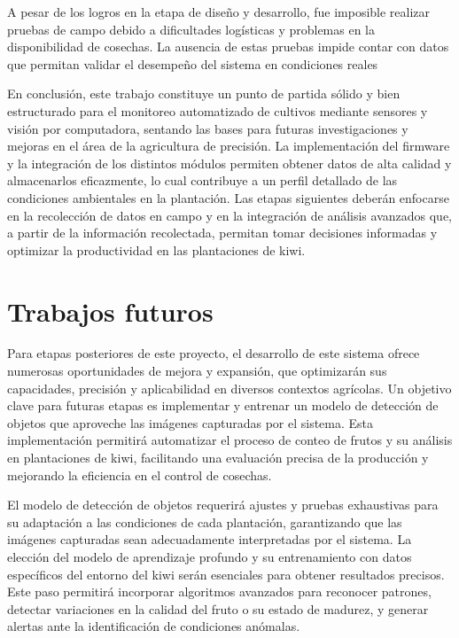A pesar de los logros en la etapa de diseño y desarrollo, fue imposible realizar pruebas de campo debido a dificultades logísticas y problemas en la disponibilidad de cosechas. La ausencia de estas pruebas impide contar con datos que permitan validar el desempeño del sistema en condiciones reales

En conclusión, este trabajo constituye un punto de partida sólido y bien estructurado para el monitoreo automatizado de cultivos mediante sensores y visión por computadora, sentando las bases para futuras investigaciones y mejoras en el área de la agricultura de precisión. La implementación del firmware y la integración de los distintos módulos permiten obtener datos de alta calidad y almacenarlos eficazmente, lo cual contribuye a un perfil detallado de las condiciones ambientales en la plantación. Las etapas siguientes deberán enfocarse en la recolección de datos en campo y en la integración de análisis avanzados que, a partir de la información recolectada, permitan tomar decisiones informadas y optimizar la productividad en las plantaciones de kiwi.

\section{Trabajos futuros}

Para etapas posteriores de este proyecto, el desarrollo de este sistema ofrece numerosas oportunidades de mejora y expansión, que optimizarán sus capacidades, precisión y aplicabilidad en diversos contextos agrícolas. Un objetivo clave para futuras etapas es implementar y entrenar un modelo de detección de objetos que aproveche las imágenes capturadas por el sistema. Esta implementación permitirá automatizar el proceso de conteo de frutos y su análisis en plantaciones de kiwi, facilitando una evaluación precisa de la producción y mejorando la eficiencia en el control de cosechas.

El modelo de detección de objetos requerirá ajustes y pruebas exhaustivas para su adaptación a las condiciones de cada plantación, garantizando que las imágenes capturadas sean adecuadamente interpretadas por el sistema. La elección del modelo de aprendizaje profundo y su entrenamiento con datos específicos del entorno del kiwi serán esenciales para obtener resultados precisos. Este paso permitirá incorporar algoritmos avanzados para reconocer patrones, detectar variaciones en la calidad del fruto o su estado de madurez, y generar alertas ante la identificación de condiciones anómalas.

